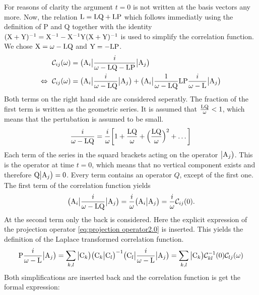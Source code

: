 %
For reasons of clarity the argument $t=0$ is not written at the basis vectors any more.
Now, the relation $\mathrm{L} = \mathrm{LQ} + \mathrm{LP}$ which follows immediatly using the definition of P and Q together with the identity $ (\mathrm{X} + \mathrm{Y})^{-1} = \mathrm{X}^{-1} - \mathrm{X}^{-1} \mathrm{Y} (\mathrm{X} + \mathrm{Y})^{-1}$ is used to simplify the correlation function.
We chose $\mathrm{X} = \omega - \mathrm{LQ}$ and $\mathrm{Y} = -\mathrm{LP}$.
%
\begin{align}
	\mathcal{C}_{ij}(\omega) &= \big({\mathrm{A}_{i}}\big| \frac{i}{\omega - \mathrm{LQ} - \mathrm{LP}} \big|{\mathrm{A}_{j}}\big)
	\notag \\
	\Leftrightarrow\ \mathcal{C}_{ij}(\omega) &= \big({\mathrm{A}_{i}}\big| \frac{i}{\omega - \mathrm{LQ}} \big|{\mathrm{A}_{j}}\big) + \big({\mathrm{A}_{i}}\big| \frac{1}{\omega - \mathrm{LQ}} \mathrm{LP} \frac{i}{\omega - \mathrm{L}} \big|{\mathrm{A}_{j}}\big)
\end{align}
%
Both terms on the right hand side are considered seperatly.
The fraction of the first term is written as the geometric series.
It is assumed that $\frac{\mathrm{LQ}}{\omega} < 1$, which means that the pertubation is assumed to be small.
%
\begin{align}
	\frac{i}{\omega - \mathrm{LQ}} = \frac{i}{\omega} \bigg[1 + \frac{\mathrm{LQ}}{\omega} + \Big(\frac{\mathrm{LQ}}{\omega}\Big)^{2} + \dots \bigg]
\end{align}
%
Each term of the series in the squard brackets acting on the operator $\big|{\mathrm{A}_{j}}\big)$.
This is the operator at time $t=0$, which means that no vertical component exists and therefore $\mathrm{Q}\big|{\mathrm{A}_{j}}\big) = 0$.
Every term contains an operator $Q$, except of the first one.
The first term of the correlation function yields
%
\begin{align}
	\big({\mathrm{A}_{i}}\big| \frac{i}{\omega - \mathrm{LQ}} \big|{\mathrm{A}_{j}}\big) = \frac{i}{\omega} \big({\mathrm{A}_{i}}\big|{\mathrm{A}_{j}}\big) = \frac{i}{\omega} \mathcal{C}_{ij}(0).
\end{align}
%
At the second term only the back is considered.
Here the explicit expression of the projection operator \ref{eq:projection operator2.0} is inserted.
This yields the definition of the Laplace transformed correlation function.
%
\begin{align}
	\mathrm{P} \frac{i}{\omega - \mathrm{L}} \big|{\mathrm{A}_{j}}\big) = \sum\limits_{k,l} \big|{\mathrm{C}_{k}}\big) \big({\mathrm{C}_{k}}\big|{\mathrm{C}_{l}}\big)^{-1} \big({\mathrm{C}_{l}}\big| \frac{i}{\omega - \mathrm{L}} \big|{\mathrm{A}_{j}}\big) = \sum\limits_{k,l} \big|{\mathrm{C}_{k}}\big) \mathcal{C}_{kl}^{-1}(0) \mathcal{C}_{lj}(\omega)
\end{align}
%
Both simplifications are inserted back and the correlation function is get the formal expression:
